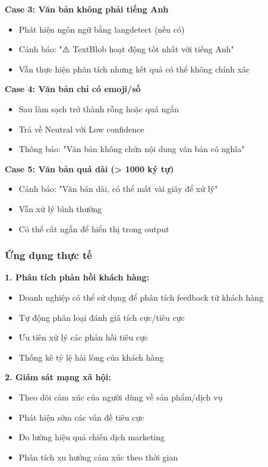 \textbf{Case 3: Văn bản không phải tiếng Anh}
\begin{itemize}
    \item Phát hiện ngôn ngữ bằng langdetect (nếu có)
    \item Cảnh báo: "⚠️ TextBlob hoạt động tốt nhất với tiếng Anh"
    \item Vẫn thực hiện phân tích nhưng kết quả có thể không chính xác
\end{itemize}

\textbf{Case 4: Văn bản chỉ có emoji/số}
\begin{itemize}
    \item Sau làm sạch trở thành rỗng hoặc quá ngắn
    \item Trả về Neutral với Low confidence
    \item Thông báo: "Văn bản không chứa nội dung văn bản có nghĩa"
\end{itemize}

\textbf{Case 5: Văn bản quá dài (> 1000 ký tự)}
\begin{itemize}
    \item Cảnh báo: "Văn bản dài, có thể mất vài giây để xử lý"
    \item Vẫn xử lý bình thường
    \item Có thể cắt ngắn để hiển thị trong output
\end{itemize}

\subsubsection{Ứng dụng thực tế}

\textbf{1. Phân tích phản hồi khách hàng:}
\begin{itemize}
    \item Doanh nghiệp có thể sử dụng để phân tích feedback từ khách hàng
    \item Tự động phân loại đánh giá tích cực/tiêu cực
    \item Ưu tiên xử lý các phản hồi tiêu cực
    \item Thống kê tỷ lệ hài lòng của khách hàng
\end{itemize}

\textbf{2. Giám sát mạng xã hội:}
\begin{itemize}
    \item Theo dõi cảm xúc của người dùng về sản phẩm/dịch vụ
    \item Phát hiện sớm các vấn đề tiêu cực
    \item Đo lường hiệu quả chiến dịch marketing
    \item Phân tích xu hướng cảm xúc theo thời gian
\end{itemize}

